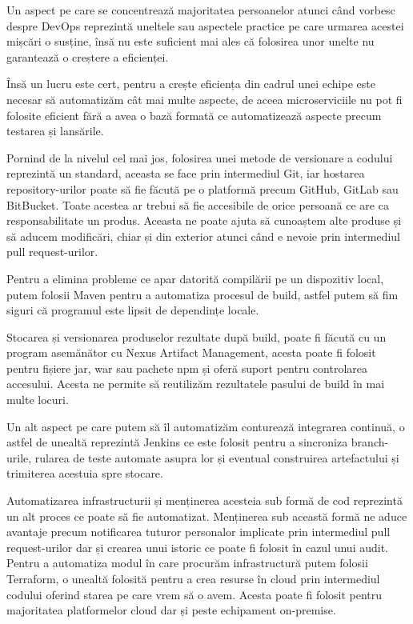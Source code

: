 Un aspect pe care se concentrează majoritatea persoanelor atunci când vorbesc
despre DevOps reprezintă uneltele sau aspectele practice pe care urmarea
acestei mișcări o susține, însă nu este suficient mai ales că folosirea
unor unelte nu garantează o creștere a eficienței.

Însă un lucru este cert, pentru a crește eficiența din cadrul unei echipe este
necesar să automatizăm cât mai multe aspecte, de aceea microserviciile nu pot fi
folosite eficient fără a avea o bază formată ce automatizează aspecte precum
testarea și lansările.

Pornind de la nivelul cel mai jos, folosirea unei metode de versionare a codului
reprezintă un standard, aceasta se face prin intermediul Git, iar hostarea repository-urilor
poate să fie făcută pe o platformă precum GitHub, GitLab sau BitBucket. Toate acestea
ar trebui să fie accesibile de orice persoană ce are ca responsabilitate un produs.
Aceasta ne poate ajuta să cunoaștem alte produse și să aducem modificări, chiar și din
exterior atunci când e nevoie prin intermediul pull request-urilor.

Pentru a elimina probleme ce apar datorită compilării pe un dispozitiv local,
putem folosii Maven pentru a automatiza procesul de build, astfel putem să fim siguri
că programul este lipsit de dependințe locale.

Stocarea și versionarea produselor rezultate după build, poate fi făcută
cu un program asemănător cu Nexus Artifact Management, acesta poate fi folosit
pentru fișiere jar, war sau pachete npm și oferă suport pentru controlarea
accesului. Acesta ne permite să reutilizăm rezultatele pasului de build în mai multe locuri.

Un alt aspect pe care putem să îl automatizăm conturează integrarea continuă, o astfel
de unealtă reprezintă Jenkins ce este folosit pentru a sincroniza branch-urile,
rularea de teste automate asupra lor și eventual construirea artefactului și trimiterea
acestuia spre stocare.

Automatizarea infrastructurii și menținerea acesteia sub formă de cod reprezintă
un alt proces ce poate să fie automatizat. Menținerea sub această formă ne aduce
avantaje precum notificarea tuturor personalor implicate prin intermediul pull request-urilor
dar și crearea unui istoric ce poate fi folosit în cazul unui audit. Pentru a automatiza
modul în care procurăm infrastructură putem folosii Terraform, o unealtă folosită
pentru a crea resurse în cloud prin intermediul codului oferind starea pe
care vrem să o avem. Acesta poate fi folosit pentru majoritatea platformelor cloud dar și
peste echipament on-premise.

